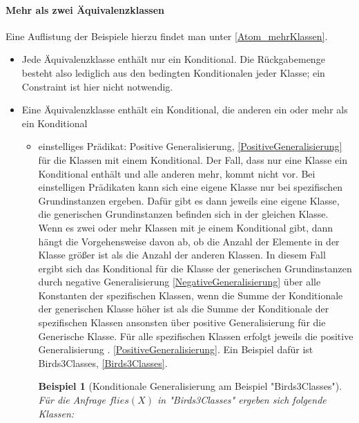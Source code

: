 \documentclass[a4paper, 11pt]{book}
\newtheorem{Bsp}{Beispiel}[section]
\begin{document}
\paragraph{ Mehr als zwei Äquivalenzklassen} 
Eine Auflistung der Beispiele hierzu findet man unter \ref{Atom_mehrKlassen}.\\
\begin{itemize}
	\item Jede Äquivalenzklasse enthält nur ein Konditional. Die Rückgabemenge besteht also lediglich aus den bedingten Konditionalen jeder Klasse; ein Constraint ist hier nicht notwendig.
	\item Eine Äquivalenzklasse enthält ein Konditional, die anderen ein oder mehr als ein Konditional
	\begin{itemize}
		\item einstelliges Prädikat: Positive Generalisierung, \ref{PositiveGeneralisierung} für die Klassen mit einem Konditional. Der Fall, dass nur eine Klasse ein Konditional enthält und alle anderen mehr, kommt nicht vor. Bei einstelligen Prädikaten kann sich eine eigene Klasse nur bei spezifischen Grundinstanzen ergeben. Dafür gibt es dann jeweils eine eigene Klasse, die generischen Grundinstanzen befinden sich in der gleichen Klasse. Wenn es zwei oder mehr Klassen mit je einem Konditional gibt, dann hängt die Vorgehensweise davon ab, ob die Anzahl der Elemente in der Klasse größer ist als die Anzahl der anderen Klassen. In diesem Fall ergibt sich das Konditional für die Klasse der generischen Grundinstanzen durch negative Generalisierung \ref{NegativeGeneralisierung} über alle Konstanten der spezifischen Klassen, wenn die Summe der Konditionale der generischen Klasse höher ist als die Summe der Konditionale der spezifischen Klassen ansonsten über positive Generalisierung für die Generische Klasse. Für alle spezifischen Klassen erfolgt jeweils die positive Generalisierung . \ref{PositiveGeneralisierung}. Ein Beispiel dafür ist Birds3Classes, \ref{Birds3Classes}.\\
		\begin{Bsp}[Konditionale Generalisierung am Beispiel "{}Birds3Classes"{}]
		Für die Anfrage $ flies(X) $ in "{}Birds3Classes"{} ergeben sich folgende Klassen:\\
		

\end{Bsp}
\end{itemize}
\end{itemize}
\end{document}
